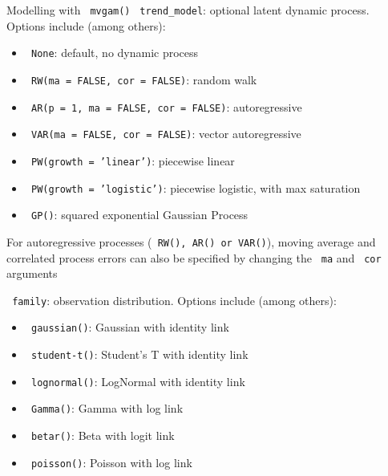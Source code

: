 \documentclass[final,9pt,fleqn]{beamer}\usepackage[]{graphicx}\usepackage[]{xcolor}
\begin{document}
\begin{frame}[fragile]
\begin{columns}
\begin{column}{0.3\paperwidth}
\begin{block}{{\fontsize{21}{21} \selectfont \color{BrickRed} Modelling with \texttt{\color{Orchid} mvgam()}}}
\medskip
\texttt{\color{Orchid} trend\_model}: optional latent dynamic process. Options include (among others):
\begin{itemize}

\item\texttt{\color{Orchid} None}: default, no dynamic process

\item\texttt{\color{Orchid} RW(ma = FALSE, cor = FALSE)}: random walk

\item\texttt{\color{Orchid} AR(p = 1, ma = FALSE, cor = FALSE)}: autoregressive

\item\texttt{\color{Orchid} VAR(ma = FALSE, cor = FALSE)}: vector autoregressive

\item\texttt{\color{Orchid} PW(growth = 'linear')}: piecewise linear

\item\texttt{\color{Orchid} PW(growth = 'logistic')}: piecewise logistic, with max saturation

\item\texttt{\color{Orchid} GP()}: squared exponential Gaussian Process
\end{itemize}
For autoregressive processes (\texttt{\color{Orchid} RW(), AR() or VAR()}), moving average and correlated process errors can also be specified by changing the \texttt{\color{Orchid} ma} and \texttt{\color{Orchid} cor} arguments

\medskip
\texttt{\color{Orchid} family}: observation distribution. Options include (among others):
\begin{itemize}

\item\texttt{\color{Orchid} gaussian()}: Gaussian with identity link

\item\texttt{\color{Orchid} student-t()}: Student's T with identity link

\item\texttt{\color{Orchid} lognormal()}: LogNormal with identity link

\item\texttt{\color{Orchid} Gamma()}: Gamma with log link

\item\texttt{\color{Orchid} betar()}: Beta with logit link

\item\texttt{\color{Orchid} poisson()}: Poisson with log link


\end{itemize}
\end{block}
\end{column}
\end{columns}
\end{frame}
\end{document}
